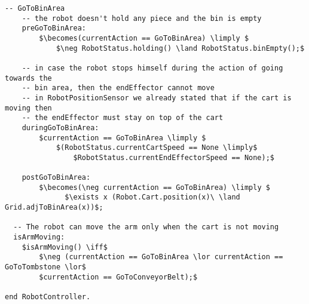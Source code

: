 \begin{lstlisting}[fontadjust, mathescape, frame=single]
  -- GoToBinArea
    -- the robot doesn't hold any piece and the bin is empty
    preGoToBinArea:
        $\becomes(currentAction == GoToBinArea) \limply $
            $\neg RobotStatus.holding() \land RobotStatus.binEmpty();$
    
    -- in case the robot stops himself during the action of going towards the 
    -- bin area, then the endEffector cannot move
    -- in RobotPositionSensor we already stated that if the cart is moving then 
    -- the endEffector must stay on top of the cart
    duringGoToBinArea:
        $currentAction == GoToBinArea \limply $
            $(RobotStatus.currentCartSpeed == None \limply$
                $RobotStatus.currentEndEffectorSpeed == None);$

    postGoToBinArea:
        $\becomes(\neg currentAction == GoToBinArea) \limply $
              $\exists x (Robot.Cart.position(x)\ \land Grid.adjToBinArea(x))$;
                      
  -- The robot can move the arm only when the cart is not moving
  isArmMoving: 
    $isArmMoving() \iff$
        $\neg (currentAction == GoToBinArea \lor currentAction == GoToTombstone \lor$
        $currentAction == GoToConveyorBelt);$
         
end RobotController.
\end{lstlisting}

